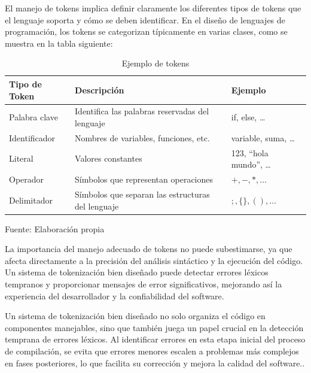 El manejo de tokens implica definir claramente los diferentes tipos de tokens que el lenguaje soporta y cómo se deben identificar. En el diseño de lenguajes de programación, los tokens se categorizan típicamente en varias clases, como se muestra en la tabla siguiente:

\begin{table}
  \begin{center}
    \begin{tabularx}{0.8\textwidth}{|X|X|X|}
      \hline
      \textbf{Tipo de Token} & \textbf{Descripción} & \textbf{Ejemplo} \\
      \hline
      Palabra clave & Identifica las palabras reservadas del lenguaje & if, else, … \\
      \hline
      Identificador & Nombres de variables, funciones, etc. & variable, suma, … \\
      \hline
      Literal & Valores constantes & 123, “hola mundo”, … \\
      \hline
      Operador & Símbolos que representan operaciones & $+, -, *, … $\\
      \hline
      Delimitador & Símbolos que separan las estructuras del lenguaje & $;, \{\}, (), …$ \\
      \hline
    \end{tabularx}
  \end{center}
  \caption{Ejemplo de tokens}
  \centering Fuente: Elaboración propia
  \label{tab:tokens}
\end{table}

La importancia del manejo adecuado de tokens no puede subestimarse, ya que afecta directamente a la precisión del análisis sintáctico y la ejecución del código. Un sistema de tokenización bien diseñado puede detectar errores léxicos tempranos y proporcionar mensajes de error significativos, mejorando así la experiencia del desarrollador y la confiabilidad del software.

Un sistema de tokenización bien diseñado no solo organiza el código en componentes manejables, sino que también juega un papel crucial en la detección temprana de errores léxicos. Al identificar errores en esta etapa inicial del proceso de compilación, se evita que errores menores escalen a problemas más complejos en fases posteriores, lo que facilita su corrección y mejora la calidad del software.. \parencite{Jeffery2021}

